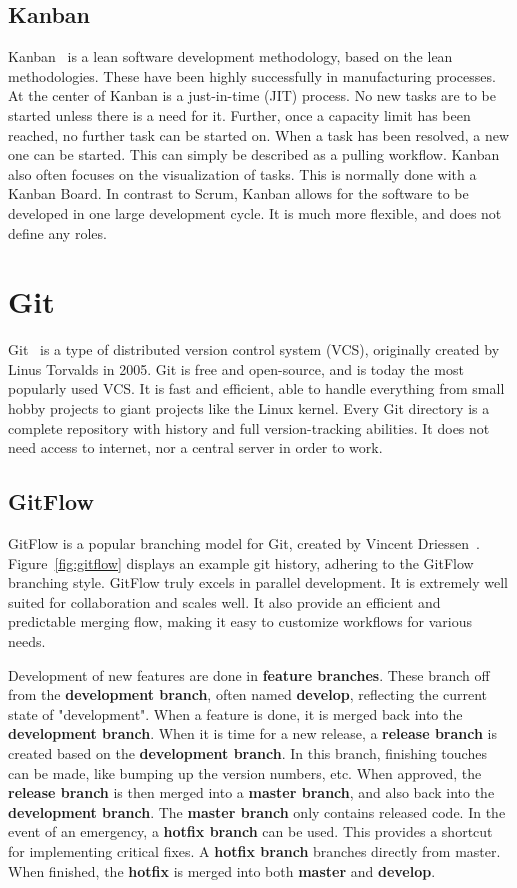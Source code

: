 \subsection{Kanban}
Kanban~\cite{kanban} is a lean software development methodology, based on the lean methodologies. These have been highly successfully in manufacturing processes. At the center of Kanban is a just-in-time (JIT) process. No new tasks are to be started unless there is a need for it. Further, once a capacity limit has been reached, no further task can be started on. When a task has been resolved, a new one can be started. This can simply be described as a pulling workflow. Kanban also often focuses on the visualization of tasks. This is normally done with a Kanban Board. In contrast to Scrum, Kanban allows for the software to be developed in one large development cycle. It is much more flexible, and does not define any roles.

\section{Git}
Git~\cite{git} is a type of distributed version control system (VCS), originally created by Linus Torvalds in 2005. Git is free and open-source, and is today the most popularly used VCS. It is fast and efficient, able to handle everything from small hobby projects to giant projects like the Linux kernel. Every Git directory is a complete repository with history and full version-tracking abilities. It does not need access to internet, nor a central server in order to work.

\subsection{GitFlow}
\label{sec:theory-gitflow}
GitFlow is a popular branching model for Git, created by Vincent Driessen~\cite{gitflow}. Figure~\ref{fig:gitflow} displays an example git history, adhering to the GitFlow branching style. GitFlow truly excels in parallel development. It is extremely well suited for collaboration and scales well. It also provide an efficient and predictable merging flow, making it easy to customize workflows for various needs.

Development of new features are done in \textbf{feature branches}. These branch off from the \textbf{development branch}, often named \textbf{develop}, reflecting the current state of "development". When a feature is done, it is merged back into the \textbf{development branch}. When it is time for a new release, a \textbf{release branch} is created based on the \textbf{development branch}. In this branch, finishing touches can be made, like bumping up the version numbers, etc. When approved, the \textbf{release branch} is then merged into a \textbf{master branch}, and also back into the \textbf{development branch}. The \textbf{master branch} only contains released code. In the event of an emergency, a \textbf{hotfix branch} can be used. This provides a shortcut for implementing critical fixes. A \textbf{hotfix branch} branches directly from master. When finished, the \textbf{hotfix} is merged into both \textbf{master} and \textbf{develop}.

